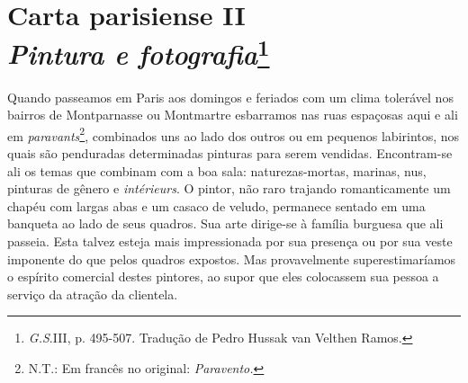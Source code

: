 \chapter{Carta parisiense II\\
\emph{Pintura e fotografia}\footnote[*]{
  \emph{G.S}.III, p. 495-507. Tradução de Pedro Hussak van Velthen
  Ramos.}}

Quando passeamos em Paris aos domingos e feriados com um clima tolerável
nos bairros de Montparnasse ou Montmartre esbarramos nas ruas espaçosas
aqui e ali em \emph{paravants}\footnote{N.T.: Em francês no original:
  \emph{Paravento.}}, combinados uns ao lado dos outros ou em pequenos
labirintos, nos quais são penduradas determinadas pinturas para serem
vendidas. Encontram-se ali os temas que combinam com a boa sala:
naturezas-mortas, marinas, nus, pinturas de gênero e \emph{intérieurs}.
O pintor, não raro trajando romanticamente um chapéu com largas abas e
um casaco de veludo, permanece sentado em uma banqueta ao lado de seus
quadros. Sua arte dirige-se à família burguesa que ali passeia. Esta
talvez esteja mais impressionada por sua presença ou por sua veste
imponente do que pelos quadros expostos. Mas provavelmente
superestimaríamos o espírito comercial destes pintores, ao supor que
eles colocassem sua pessoa a serviço da atração da clientela.

